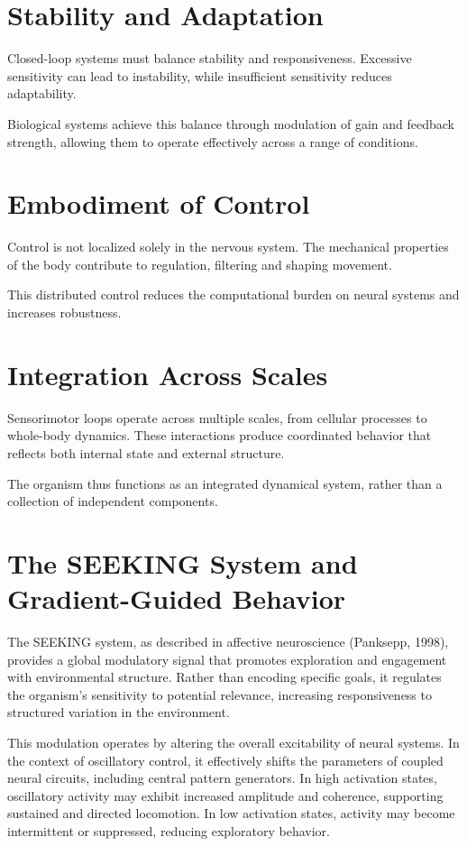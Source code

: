 \documentclass[11pt,oneside]{book}
\begin{document}
\section{Stability and Adaptation}

Closed-loop systems must balance stability and responsiveness. Excessive sensitivity can lead to instability, while insufficient sensitivity reduces adaptability.

Biological systems achieve this balance through modulation of gain and feedback strength, allowing them to operate effectively across a range of conditions.

\section{Embodiment of Control}

Control is not localized solely in the nervous system. The mechanical properties of the body contribute to regulation, filtering and shaping movement.

This distributed control reduces the computational burden on neural systems and increases robustness.

\section{Integration Across Scales}

Sensorimotor loops operate across multiple scales, from cellular processes to whole-body dynamics. These interactions produce coordinated behavior that reflects both internal state and external structure.

The organism thus functions as an integrated dynamical system, rather than a collection of independent components.

\section{The SEEKING System and Gradient-Guided Behavior}

The SEEKING system, as described in affective neuroscience (Panksepp, 1998), provides a global modulatory signal that promotes exploration and engagement with environmental structure. Rather than encoding specific goals, it regulates the organism’s sensitivity to potential relevance, increasing responsiveness to structured variation in the environment.

This modulation operates by altering the overall excitability of neural systems. In the context of oscillatory control, it effectively shifts the parameters of coupled neural circuits, including central pattern generators. In high activation states, oscillatory activity may exhibit increased amplitude and coherence, supporting sustained and directed locomotion. In low activation states, activity may become intermittent or suppressed, reducing exploratory behavior.
\end{document}

